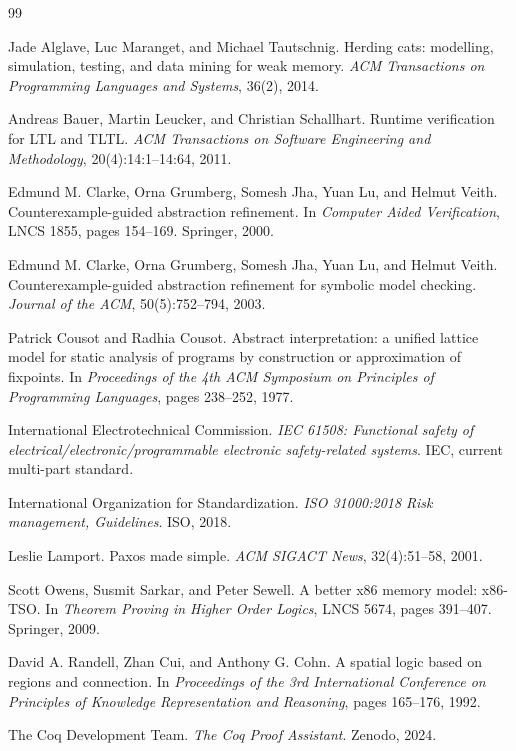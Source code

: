 \documentclass[a4paper,11pt]{article}
\begin{document}
\begin{thebibliography}{99}

Jade Alglave, Luc Maranget, and Michael Tautschnig.
\newblock Herding cats: modelling, simulation, testing, and data mining for weak memory.
\newblock \emph{ACM Transactions on Programming Languages and Systems}, 36(2), 2014.

Andreas Bauer, Martin Leucker, and Christian Schallhart.
\newblock Runtime verification for LTL and TLTL.
\newblock \emph{ACM Transactions on Software Engineering and Methodology}, 20(4):14:1--14:64, 2011.

Edmund M. Clarke, Orna Grumberg, Somesh Jha, Yuan Lu, and Helmut Veith.
\newblock Counterexample-guided abstraction refinement.
\newblock In \emph{Computer Aided Verification}, LNCS 1855, pages 154--169. Springer, 2000.

Edmund M. Clarke, Orna Grumberg, Somesh Jha, Yuan Lu, and Helmut Veith.
\newblock Counterexample-guided abstraction refinement for symbolic model checking.
\newblock \emph{Journal of the ACM}, 50(5):752--794, 2003.

Patrick Cousot and Radhia Cousot.
\newblock Abstract interpretation: a unified lattice model for static analysis of programs by construction or approximation of fixpoints.
\newblock In \emph{Proceedings of the 4th ACM Symposium on Principles of Programming Languages}, pages 238--252, 1977.

International Electrotechnical Commission.
\newblock \emph{IEC 61508: Functional safety of electrical/electronic/programmable electronic safety-related systems}.
\newblock IEC, current multi-part standard.

International Organization for Standardization.
\newblock \emph{ISO 31000:2018 Risk management, Guidelines}.
\newblock ISO, 2018.

Leslie Lamport.
\newblock Paxos made simple.
\newblock \emph{ACM SIGACT News}, 32(4):51--58, 2001.

Scott Owens, Susmit Sarkar, and Peter Sewell.
\newblock A better x86 memory model: x86-TSO.
\newblock In \emph{Theorem Proving in Higher Order Logics}, LNCS 5674, pages 391--407. Springer, 2009.

David A. Randell, Zhan Cui, and Anthony G. Cohn.
\newblock A spatial logic based on regions and connection.
\newblock In \emph{Proceedings of the 3rd International Conference on Principles of Knowledge Representation and Reasoning}, pages 165--176, 1992.

The Coq Development Team.
\newblock \emph{The Coq Proof Assistant}.
\newblock Zenodo, 2024.

\end{thebibliography}
\end{document}
